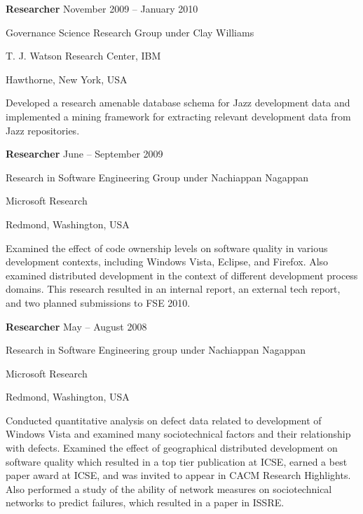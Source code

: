 \documentclass[margin,line,article,letterpaper]{res}
\newenvironment{list1}{
  \begin{list}{}{%
      \setlength{\itemsep}{0in}
      \setlength{\parsep}{0in} \setlength{\parskip}{0in}
      \setlength{\topsep}{0in} \setlength{\partopsep}{0in} 
      \setlength{\leftmargin}{0.17in}}}{\end{list}}
\newcommand{\timespan}[1]{#1}
\begin{document}
\begin{resume}
\textbf{Researcher} \hfill \timespan{November 2009 -- January 2010}\\
\vspace{-10pt}
\begin{list1}
\item Governance Science Research Group under Clay Williams
\item T. J. Watson Research Center, IBM
\item Hawthorne, New York, USA
\vspace{6pt}
\item Developed a research amenable database schema for Jazz development
    data and implemented a mining framework for extracting relevant development
    data from Jazz repositories.
\end{list1}


\textbf{Researcher} \hfill \timespan{June -- September 2009}\\
\vspace{-10pt}
\begin{list1}
\item Research in Software Engineering Group under Nachiappan Nagappan
\item Microsoft Research
\item Redmond, Washington, USA
\vspace{6pt}
\item Examined the effect of code ownership levels on software quality in various
	development contexts, including Windows Vista, Eclipse, and Firefox.  Also
	examined distributed development in the context of different development
	process domains.  This research resulted in an internal report, an external
	tech report, and two planned submissions to FSE 2010.
\end{list1}

\textbf{Researcher} \hfill \timespan{May -- August 2008}\\
\vspace{-10pt}
\begin{list1}
\item Research in Software Engineering group under Nachiappan Nagappan
\item Microsoft Research
\item Redmond, Washington, USA
\vspace{6pt}
\item Conducted quantitative analysis on defect data related to development of Windows 
Vista and examined many sociotechnical factors and their relationship with defects. 
Examined the effect of geographical distributed development on software quality which 
resulted in a top tier publication at ICSE, earned a best paper award at ICSE,
and was invited to appear in CACM Research Highlights.  Also performed a study
of the ability of network measures on sociotechnical networks to predict failures,
which resulted in a paper in ISSRE.
\end{list1}


\end{resume}
\end{document}
